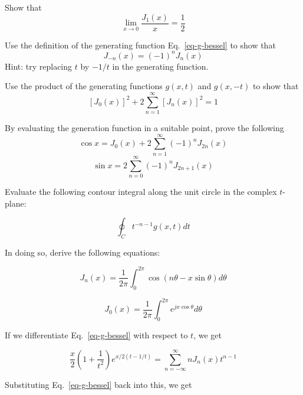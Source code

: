 \begin{exer}
Show that
$$\lim_{x \to 0} \frac{J_1(x)}{x}= \frac{1}{2}$$
\end{exer}

\begin{exer}
Use the definition of the generating function Eq.~\ref{eq-g-bessel} to show that
$$J_{-n}(x)=(-1)^nJ _n(x)$$
Hint: try replacing $t$ by $-1/t$ in the generating function.
\end{exer}

\begin{exer}
Use the product of the generating functions $g(x,t)$ and $g(x,-t)$ to show that
$$\left[ J_0(x) \right]^2 + 2 \sum_{n=1}^\infty \left[ J_n(x) \right]^2 = 1 $$
\end{exer}

\begin{sidebar}
\begin{ex}
By evaluating the generation function in a suitable point, prove the following
$$ \cos x =  J_0(x) + 2 \sum_{n=1}^\infty (-1)^n J_{2n}(x)  $$
$$ \sin x =  2 \sum_{n=0}^\infty (-1)^n J_{2n+1}(x)  $$
\end{ex}
\end{sidebar}

\begin{sidebar}
\begin{ex}
Evaluate the following contour integral along the unit circle in the complex $t$-plane:

$$ \oint_C t^{-n-1} g(x,t) dt $$

In doing so, derive the following equations:

$$J_n(x) = \frac {1}{2\pi} \int_0 ^ {2 \pi} \cos (n \theta - x \sin \theta ) d\theta $$

$$ J_0(x) =  \frac {1}{2\pi} \int_0 ^ {2 \pi}  e^{j x \cos \theta} d \theta $$
\end{ex}
\end{sidebar}



If we differentiate Eq.~\ref{eq-g-bessel} with respect to $t$, we get

\begin{equation}
\frac{x}{2}\left({1 + \frac{1}{t^2}}\right) e^{x/2(t-1/t)} = \sum_{n = - \infty}^{\infty} n J_n(x)t^{n-1}
\end{equation}

Substituting Eq.~\ref{eq-g-bessel} back into this, we get

